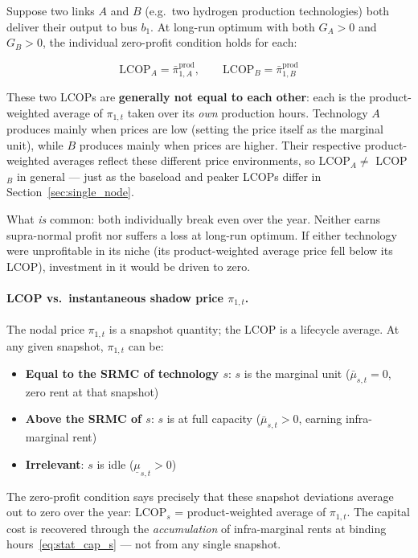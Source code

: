 \documentclass{article}
\begin{document}
Suppose two links $A$ and $B$ (e.g.\ two hydrogen production technologies)
both deliver their output to bus $b_1$. At long-run optimum with both
$G_A > 0$ and $G_B > 0$, the individual zero-profit condition holds for each:

\begin{equation}
    \text{LCOP}_A = \bar{\pi}^{\text{prod}}_{1,A}, \qquad
    \text{LCOP}_B = \bar{\pi}^{\text{prod}}_{1,B}
\end{equation}

These two LCOPs are \textbf{generally not equal to each other}: each is the
product-weighted average of $\pi_{1,t}$ taken over its \emph{own} production
hours. Technology $A$ produces mainly when prices are low (setting the price
itself as the marginal unit), while $B$ produces mainly when prices are higher.
Their respective product-weighted averages reflect these different price
environments, so LCOP$_A \ne$ LCOP$_B$ in general --- just as the baseload
and peaker LCOPs differ in Section~\ref{sec:single_node}.

What \emph{is} common: both individually break even over the year.
Neither earns supra-normal profit nor suffers a loss at long-run optimum.
If either technology were unprofitable in its niche (its product-weighted
average price fell below its LCOP), investment in it would be driven to zero.

\paragraph{LCOP vs.\ instantaneous shadow price $\pi_{1,t}$.}
The nodal price $\pi_{1,t}$ is a snapshot quantity; the LCOP is a lifecycle
average. At any given snapshot, $\pi_{1,t}$ can be:
\begin{itemize}
    \item \textbf{Equal to the SRMC of technology $s$}: $s$ is the marginal
          unit ($\bar{\mu}_{s,t} = 0$, zero rent at that snapshot)
    \item \textbf{Above the SRMC of $s$}: $s$ is at full capacity
          ($\bar{\mu}_{s,t} > 0$, earning infra-marginal rent)
    \item \textbf{Irrelevant}: $s$ is idle ($\underline{\mu}_{s,t} > 0$)
\end{itemize}
The zero-profit condition says precisely that these snapshot deviations
average out to zero over the year: LCOP$_s$ = product-weighted average of
$\pi_{1,t}$. The capital cost is recovered through the \emph{accumulation}
of infra-marginal rents at binding hours~\eqref{eq:stat_cap_s} --- not
from any single snapshot.
\end{document}
